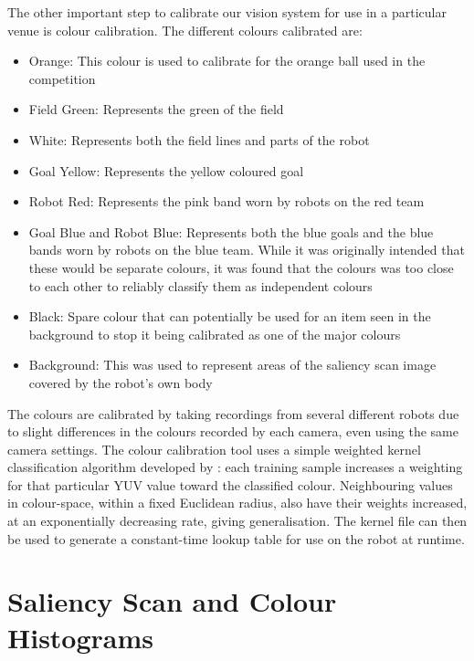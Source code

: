 \documentclass[pdftex,11pt,a4paper]{report}
\begin{document}
The other important step to calibrate our vision system for use in a particular venue is colour calibration. The different colours calibrated are: \begin{itemize}
\item{Orange: This colour is used to calibrate for the orange ball used in the competition}
\item{Field Green: Represents the green of the field}
\item{White: Represents both the field lines and parts of the robot}
\item{Goal Yellow: Represents the yellow coloured goal}
\item{Robot Red: Represents the pink band worn by robots on the red team}
\item{Goal Blue and Robot Blue: Represents both the blue goals and the blue bands worn by robots on the blue team. While it was originally intended that these would be separate colours, it was found that the colours was too close to each other to reliably classify them as independent colours}
\item{Black: Spare colour that can potentially be used for an item seen in the background to stop it being calibrated as one of the major colours}
\item{Background: This was used to represent areas of the saliency scan image covered by the robot's own body}
\end{itemize}

The colours are calibrated by taking recordings from several different robots due to slight differences in the colours recorded by each camera, even using the same camera settings. The colour calibration tool uses a simple weighted kernel classification algorithm developed by \cite{kimcuongpham}: each training sample increases a weighting for that particular YUV value toward the classified colour. Neighbouring values in colour-space, within a fixed Euclidean radius, also have their weights increased, at an exponentially decreasing rate, giving generalisation. The kernel file can then be used to generate a constant-time lookup table for use on the robot at runtime.

\section{Saliency Scan and Colour Histograms \label{saliencyScan}}
\end{document}
